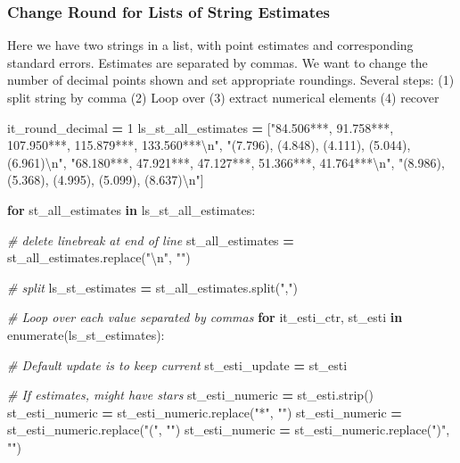 \documentclass[
]{book}
\newenvironment{Shaded}{\begin{snugshade}}{\end{snugshade}}
\newcommand{\BuiltInTok}[1]{#1}
\newcommand{\CharTok}[1]{\textcolor[rgb]{0.31,0.60,0.02}{#1}}
\newcommand{\CommentTok}[1]{\textcolor[rgb]{0.56,0.35,0.01}{\textit{#1}}}
\newcommand{\ControlFlowTok}[1]{\textcolor[rgb]{0.13,0.29,0.53}{\textbf{#1}}}
\newcommand{\DecValTok}[1]{\textcolor[rgb]{0.00,0.00,0.81}{#1}}
\newcommand{\KeywordTok}[1]{\textcolor[rgb]{0.13,0.29,0.53}{\textbf{#1}}}
\newcommand{\NormalTok}[1]{#1}
\newcommand{\OperatorTok}[1]{\textcolor[rgb]{0.81,0.36,0.00}{\textbf{#1}}}
\newcommand{\StringTok}[1]{\textcolor[rgb]{0.31,0.60,0.02}{#1}}
\begin{document}
\hypertarget{change-round-for-lists-of-string-estimates}{%
\subsubsection{Change Round for Lists of String Estimates}\label{change-round-for-lists-of-string-estimates}}

Here we have two strings in a list, with point estimates and corresponding standard errors. Estimates are separated by commas. We want to change the number of decimal points shown and set appropriate roundings. Several steps: (1) split string by comma (2) Loop over (3) extract numerical elements (4) recover

\begin{Shaded}
\begin{Highlighting}[]
\NormalTok{it\_round\_decimal }\OperatorTok{=} \DecValTok{1}
\NormalTok{ls\_st\_all\_estimates }\OperatorTok{=}\NormalTok{ [}\StringTok{"84.506***, 91.758***, 107.950***, 115.879***, 133.560***}\CharTok{\textbackslash{}n}\StringTok{"}\NormalTok{,}
                       \StringTok{"(7.796), (4.848), (4.111), (5.044), (6.961)}\CharTok{\textbackslash{}n}\StringTok{"}\NormalTok{,}
                       \StringTok{"68.180***, 47.921***, 47.127***, 51.366***, 41.764***}\CharTok{\textbackslash{}n}\StringTok{"}\NormalTok{,}
                       \StringTok{"(8.986), (5.368), (4.995), (5.099), (8.637)}\CharTok{\textbackslash{}n}\StringTok{"}\NormalTok{]}

\ControlFlowTok{for}\NormalTok{ st\_all\_estimates }\KeywordTok{in}\NormalTok{ ls\_st\_all\_estimates:}

    \CommentTok{\# delete linebreak at end of line }
\NormalTok{    st\_all\_estimates }\OperatorTok{=}\NormalTok{ st\_all\_estimates.replace(}\StringTok{"}\CharTok{\textbackslash{}n}\StringTok{"}\NormalTok{, }\StringTok{""}\NormalTok{)}
    
    \CommentTok{\# split}
\NormalTok{    ls\_st\_estimates }\OperatorTok{=}\NormalTok{ st\_all\_estimates.split(}\StringTok{","}\NormalTok{)}

    \CommentTok{\# Loop over each value separated by commas}
    \ControlFlowTok{for}\NormalTok{ it\_esti\_ctr, st\_esti }\KeywordTok{in} \BuiltInTok{enumerate}\NormalTok{(ls\_st\_estimates):}
    
        \CommentTok{\# Default update is to keep current}
\NormalTok{        st\_esti\_update }\OperatorTok{=}\NormalTok{ st\_esti}
    
        \CommentTok{\# If estimates, might have stars}
\NormalTok{        st\_esti\_numeric }\OperatorTok{=}\NormalTok{ st\_esti.strip()}
\NormalTok{        st\_esti\_numeric }\OperatorTok{=}\NormalTok{ st\_esti\_numeric.replace(}\StringTok{"*"}\NormalTok{, }\StringTok{""}\NormalTok{)}
\NormalTok{        st\_esti\_numeric }\OperatorTok{=}\NormalTok{ st\_esti\_numeric.replace(}\StringTok{"("}\NormalTok{, }\StringTok{""}\NormalTok{)}
\NormalTok{        st\_esti\_numeric }\OperatorTok{=}\NormalTok{ st\_esti\_numeric.replace(}\StringTok{")"}\NormalTok{, }\StringTok{""}\NormalTok{)}
    

\end{Highlighting}
\end{Shaded}
\end{document}
